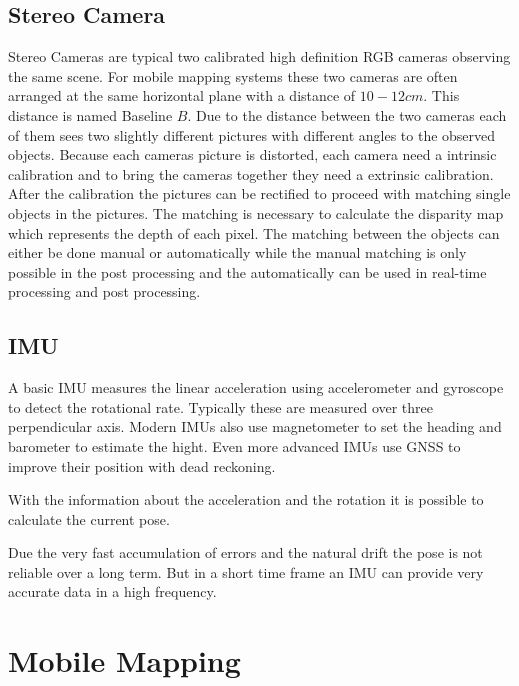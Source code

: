 \subsection{Stereo Camera}\label{ssec:stereoCamera}
Stereo Cameras are typical two calibrated high definition RGB cameras observing the same scene.
For mobile mapping systems these two cameras are often arranged at the same horizontal plane with a distance of $10-12\si{cm}$.
This distance is named Baseline $B$.
Due to the distance between the two cameras each of them sees two slightly different pictures with different angles to the observed objects.
Because each cameras picture is distorted, each camera need a intrinsic calibration and to bring the cameras together they need a extrinsic calibration. 
After the calibration the pictures can be rectified to proceed with matching single objects in the pictures.
The matching is necessary to calculate the disparity map which represents the depth of each pixel.
The matching between the objects can either be done manual or automatically while the manual matching is only possible in the post processing and the automatically can be used in real-time processing and post processing.

\subsection{IMU}\label{ssec:imu}

A basic \ac{IMU} measures the linear acceleration using accelerometer and gyroscope to detect the rotational rate.
Typically these are measured over three perpendicular axis.
Modern \ac{IMU}s also use magnetometer to set the heading and barometer to estimate the hight.
Even more advanced \ac{IMU}s use \ac{GNSS} to improve their position with dead reckoning.

With the information about the acceleration and the rotation it is possible to calculate the current pose. 

Due the very fast accumulation of errors and the natural drift the pose is not reliable over a long term.
But in a short time frame an \ac{IMU} can provide very accurate data in a high frequency. 

\section{Mobile Mapping}\label{sec:mobileMapping}

